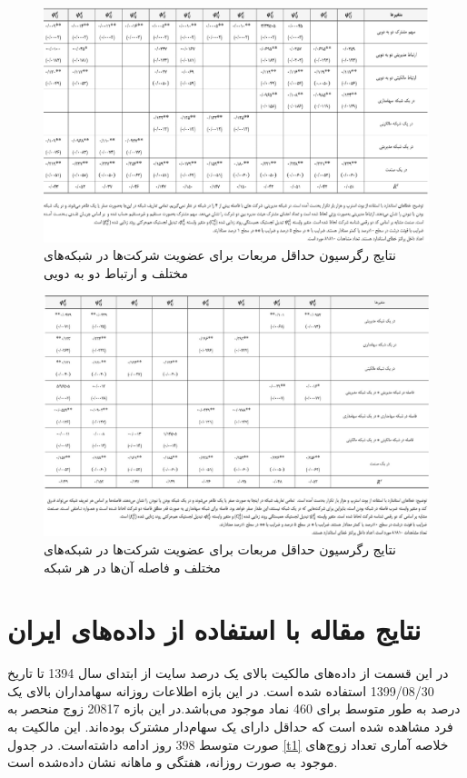 \documentclass[12pt]{article}
\begin{document}
\begin{landscape}
\begin{figure}
\centering
\includegraphics[width=\columnwidth]{Table2.png}
\caption{نتایج رگرسیون حداقل مربعات برای عضویت شرکت‌ها در شبکه‌های مختلف و ارتباط دو به دویی}
\label{g2}
\end{figure}
\begin{figure}
\centering
\includegraphics[width=\columnwidth]{Table3.png}
\caption{نتایج رگرسیون حداقل مربعات برای عضویت شرکت‌ها در شبکه‌های مختلف و فاصله آن‌ها در هر شبکه}
\label{g3}
\end{figure}
\end{landscape}


\section{نتایج مقاله با استفاده از داده‌های ایران}
در این قسمت  از داده‌های مالکیت بالای یک درصد سایت 
از ابتدای سال 1394 تا تاریخ 1399/08/30 استفاده شده است. در این بازه اطلاعات روزانه سهامداران بالای یک درصد به طور متوسط برای 460 نماد موجود می‌باشد.در این بازه 20817 زوج منحصر به فرد مشاهده شده است که حداقل دارای یک سهام‌دار مشترک بوده‌اند. این مالکیت به صورت متوسط
$ { 398} $
 روز ادامه داشته‌است. در جدول 
\ref{t1}
خلاصه آماری تعداد زوج‌های موجود به صورت روزانه، هفتگی و ماهانه نشان داده‌شده است.
\end{document}
